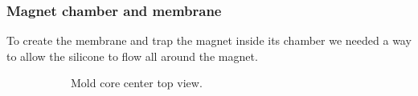 \subsubsection{Magnet chamber and membrane}
To create the membrane and trap the magnet inside its chamber we needed a way to allow the silicone to flow all around the magnet.
\begin{figure}
    \centering
    \begin{subfigure}[b]{0.475\textwidth}
        \centering
        \caption{Mold core center top view.}
        \label{fig: mat_mold_core_center_top}
    \end{subfigure}
    \hfill
    \begin{subfigure}[b]{0.475\textwidth}
        \centering
\end{subfigure}
\end{figure}
